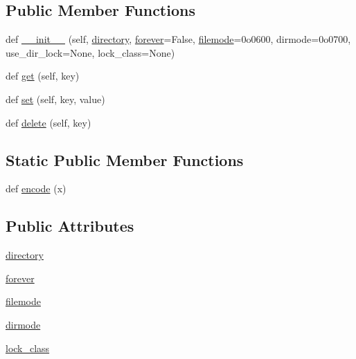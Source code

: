 \subsection*{Public Member Functions}
\begin{DoxyCompactItemize}
\item 
def \hyperlink{classpip_1_1__vendor_1_1cachecontrol_1_1caches_1_1file__cache_1_1FileCache_ae374f689c365e57d93c45f680ffb1de2}{\+\_\+\+\_\+init\+\_\+\+\_\+} (self, \hyperlink{classpip_1_1__vendor_1_1cachecontrol_1_1caches_1_1file__cache_1_1FileCache_a9c88991e3c0fd3ae75e65949751f109d}{directory}, \hyperlink{classpip_1_1__vendor_1_1cachecontrol_1_1caches_1_1file__cache_1_1FileCache_a166a576fcedca47d2b7a0403c5d8b884}{forever}=False, \hyperlink{classpip_1_1__vendor_1_1cachecontrol_1_1caches_1_1file__cache_1_1FileCache_aa9e28f28443e687c98b08a25f83f20a8}{filemode}=0o0600, dirmode=0o0700, use\+\_\+dir\+\_\+lock=\+None, lock\+\_\+class=\+None)
\item 
def \hyperlink{classpip_1_1__vendor_1_1cachecontrol_1_1caches_1_1file__cache_1_1FileCache_abaf8e68f7bf2b7ed1f4f3d19cf8502cc}{get} (self, key)
\item 
def \hyperlink{classpip_1_1__vendor_1_1cachecontrol_1_1caches_1_1file__cache_1_1FileCache_a7cd74c84895c0914d0561d7ad47a9288}{set} (self, key, value)
\item 
def \hyperlink{classpip_1_1__vendor_1_1cachecontrol_1_1caches_1_1file__cache_1_1FileCache_a1f44d290ce63c0561cbd10a4d03bd499}{delete} (self, key)
\end{DoxyCompactItemize}
\subsection*{Static Public Member Functions}
\begin{DoxyCompactItemize}
\item 
def \hyperlink{classpip_1_1__vendor_1_1cachecontrol_1_1caches_1_1file__cache_1_1FileCache_a332cb83da1e988931abc75e2634718de}{encode} (x)
\end{DoxyCompactItemize}
\subsection*{Public Attributes}
\begin{DoxyCompactItemize}
\item 
\hyperlink{classpip_1_1__vendor_1_1cachecontrol_1_1caches_1_1file__cache_1_1FileCache_a9c88991e3c0fd3ae75e65949751f109d}{directory}
\item 
\hyperlink{classpip_1_1__vendor_1_1cachecontrol_1_1caches_1_1file__cache_1_1FileCache_a166a576fcedca47d2b7a0403c5d8b884}{forever}
\item 
\hyperlink{classpip_1_1__vendor_1_1cachecontrol_1_1caches_1_1file__cache_1_1FileCache_aa9e28f28443e687c98b08a25f83f20a8}{filemode}
\item 
\hyperlink{classpip_1_1__vendor_1_1cachecontrol_1_1caches_1_1file__cache_1_1FileCache_ab987734c3cfe7de6b54297c604f4bfcf}{dirmode}
\item 
\hyperlink{classpip_1_1__vendor_1_1cachecontrol_1_1caches_1_1file__cache_1_1FileCache_a4290ad4eb3db0f0aed4f8e20bd4b1a5e}{lock\+\_\+class}
\end{DoxyCompactItemize}


